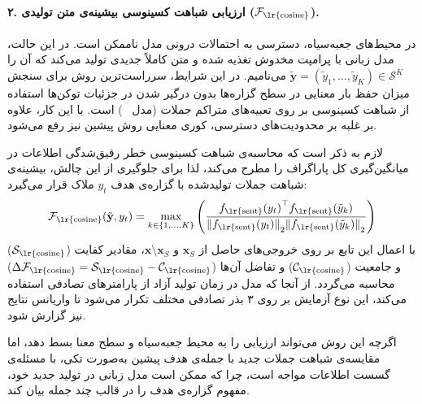 \paragraph{۲. ارزیابی شباهت کسینوسی بیشینه‌ی متن تولیدی ($\mathcal{F}_{\text{\lr{cosine}}}$).}
در محیط‌های جعبه‌سیاه، دسترسی به احتمالات درونی مدل ناممکن است. در این حالت، مدل زبانی با پرامپت مخدوش تغذیه شده و متن کاملاً جدیدی تولید می‌کند که آن را $\tilde{\mathbf{y}} = (\tilde{y}_1, \dots, \tilde{y}_K) \in \mathcal{S}^K$ می‌نامیم. در این شرایط، سرراست‌ترین روش برای سنجش میزان حفظ بار معنایی در سطح گزاره‌ها بدون درگیر شدن در جزئیات توکن‌ها استفاده از شباهت کسینوسی بر روی تعبیه‌های متراکم جملات (مدل ~\cite{song2020mpnet}) است. با این کار، علاوه بر غلبه بر محدودیت‌های دسترسی، کوری معنایی روش پیشین نیز رفع می‌شود.

لازم به ذکر است که محاسبه‌ی شباهت کسینوسی خطر رقیق‌شدگی اطلاعات در میانگین‌گیری کل پاراگراف را مطرح می‌کند، لذا برای جلوگیری از این چالش، بیشینه‌ی شباهت جملات تولیدشده با گزاره‌ی هدف $y_t$ ملاک قرار می‌گیرد:
\begin{equation}
    \mathcal{F}_{\text{\lr{cosine}}}(\tilde{\mathbf{y}}, y_t) = \max_{k \in \{1, \dots, K\}} \left( \frac{{f_{\text{\lr{sent}}}(y_t)}^\top f_{\text{\lr{sent}}}(\tilde{y}_k)}{{\|f_{\text{\lr{sent}}}(y_t)\|}_2 {\|f_{\text{\lr{sent}}}(\tilde{y}_k)\|}_2} \right)
\end{equation}
با اعمال این تابع بر روی خروجی‌های حاصل از $\mathbf{x}_S$ و $\mathbf{x} \setminus \mathbf{x}_S$، مقادیر کفایت ($\mathcal{S}_{\text{\lr{cosine}}}$) و جامعیت ($\mathcal{C}_{\text{\lr{cosine}}}$) و تفاضل آن‌ها ($\Delta\mathcal{F}_{\text{\lr{cosine}}} = \mathcal{S}_{\text{\lr{cosine}}} - \mathcal{C}_{\text{\lr{cosine}}}$) محاسبه می‌گردد. از آنجا که مدل در زمان تولید آزاد از پارامترهای تصادفی استفاده می‌کند، این نوع آزمایش بر روی ۳ بذر تصادفی مختلف تکرار می‌شود تا واریانس نتایج نیز گزارش شود.

اگرچه این روش می‌تواند ارزیابی را به محیط جعبه‌سیاه و سطح معنا بسط دهد، اما مقایسه‌ی شباهت جملات جدید با جمله‌ی هدف پیشین به‌صورت تکی، با مسئله‌ی گسست اطلاعات مواجه است، چرا که ممکن است مدل زبانی در تولید جدید خود، مفهوم گزاره‌ی هدف را در قالب چند جمله بیان کند.


